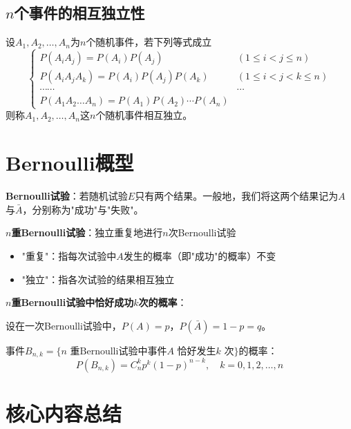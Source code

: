 \documentclass[11pt,a4paper]{report}
\theoremstyle{definition}
\theoremstyle{plain}
\begin{document}
\subsection{\texorpdfstring{$n$}{n}个事件的相互独立性}

设$A_1,A_2,\ldots,A_n$为$n$个随机事件，若下列等式成立
\[
\begin{cases}
P(A_iA_j)=P(A_i)P(A_j) & (1\leq i<j\leq n)\\
P(A_iA_jA_k)=P(A_i)P(A_j)P(A_k) & (1\leq i<j<k\leq n)\\
\cdots\cdots & \cdots\\
P(A_1A_2\ldots A_n)=P(A_1)P(A_2)\cdots P(A_n)
\end{cases}
\]
则称$A_1,A_2,\ldots,A_n$这$n$个随机事件相互独立。

\section{Bernoulli概型}

\textbf{Bernoulli试验}：若随机试验$E$只有两个结果。一般地，我们将这两个结果记为$A$与$\bar{A}$，分别称为"成功"与"失败"。

\textbf{$n$重Bernoulli试验}：独立重复地进行$n$次Bernoulli试验
\begin{itemize}[leftmargin=2em]
    \item "重复"：指每次试验中$A$发生的概率（即"成功"的概率）不变
    \item "独立"：指各次试验的结果相互独立
\end{itemize}

\textbf{$n$重Bernoulli试验中恰好成功$k$次的概率}：

设在一次Bernoulli试验中，$P(A)=p$，$P(\bar{A})=1-p=q$。

事件$B_{n,k}=\{n\text{ 重Bernoulli试验中事件}A\text{ 恰好发生}k\text{ 次}\}$的概率：
\[
P(B_{n,k})=C_n^kp^k(1-p)^{n-k},\quad k=0,1,2,\ldots,n
\]

\section{核心内容总结}
\end{document}
